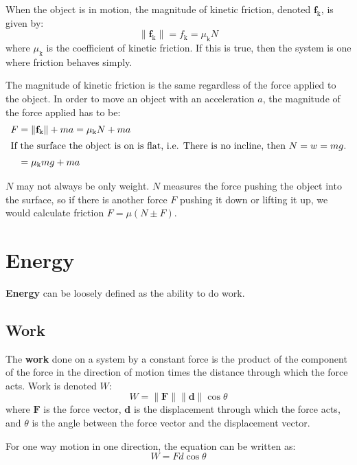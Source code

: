 \documentclass{article}
\newcommand{\definition}[1]{\begin{tcolorbox}[colback=red!5!white,colframe=red!75!black,parbox=false] #1 \end{tcolorbox}}
\begin{document}
When the object is in motion, the magnitude of kinetic friction, denoted $\mathbf{f}_{\text{k}}$, is given by:
\begin{equation*}
	\lVert \mathbf{f}_{\text{k}}\rVert =f_{\text{k}}=\mu_{\text{k}} N
\end{equation*}
where $\mu_{\text{k}}$ is the coefficient of kinetic friction. If this is true, then the system is one where friction behaves simply.

The magnitude of kinetic friction is the same regardless of the force applied to the object. In order to move an object with an acceleration $a$, the magnitude of the force applied has to be:
\begin{align*}
	F
	&=\lVert \mathbf{f}_{\text{k}} \rVert +ma
	=\mu_{\text{k}}N+ma \\
	\intertext{If the surface the object is on is flat, i.e. There is no incline, then $N=w=mg$.}
	&=\mu_{\text{k}}mg+ma
\end{align*}

$N$ may not always be only weight. $N$ measures the force pushing the object into the surface, so if there is another force $F$ pushing it down or lifting it up, we would calculate friction $F=\mu (N\pm F)$.

\section{Energy}

\definition{\textbf{Energy} can be loosely defined as the ability to do work.}

\subsection{Work}

\definition{The \textbf{work} done on a system by a constant force is the product of the component of the force in the direction of motion times the distance through which the force acts. Work is denoted $W$:
\begin{equation*}
    W=\lVert \mathbf{F} \rVert \lVert \mathbf{d} \rVert \cos \theta
\end{equation*}
where $\mathbf{F}$ is the force vector, $\mathbf{d}$ is the displacement through which the force acts, and $\theta$ is the angle between the force vector and the displacement vector.
}

For one way motion in one direction, the equation can be written as:
\begin{equation*}
    W=Fd\cos\theta
\end{equation*}
\end{document}
